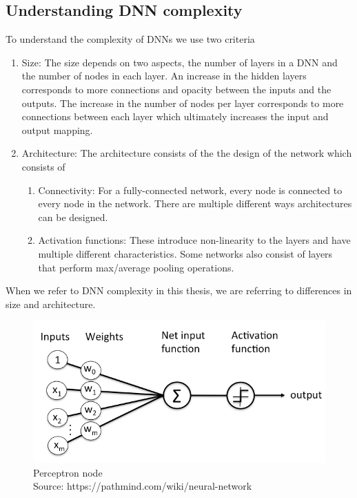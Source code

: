 \subsection{Understanding DNN complexity}
\label{dnncomplexity}
To understand the complexity of \ac{DNN}s we use two criteria
\begin{enumerate}
	\item Size: The size depends on two aspects, the number of layers in a \ac{DNN} and the number of nodes in each layer. 
    An increase in the hidden layers corresponds to more connections and opacity between the inputs and the outputs. 
    The increase in the number of nodes per layer corresponds to more connections between each layer which ultimately increases the input and output mapping. 
	\item Architecture: The architecture consists of the the design of the network which consists of 
	\begin{enumerate}
		\item Connectivity: For a fully-connected network, every node is connected to every node in the network.
		There are multiple different ways architectures can be designed. 
		\item Activation functions: These introduce non-linearity to the layers and have multiple different characteristics. Some networks also consist of layers that perform max/average pooling operations. 
	\end{enumerate}
	

	
\end{enumerate}
When we refer to \ac{DNN} complexity in this thesis, we are referring to differences in size and architecture.


\begin{figure}
	\centering
	\includegraphics[width=0.7\linewidth]{Images/perceptron_node}
	\caption{Perceptron node  \\ Source: https://pathmind.com/wiki/neural-network}
	\label{fig:perceptronnode}
\end{figure}

